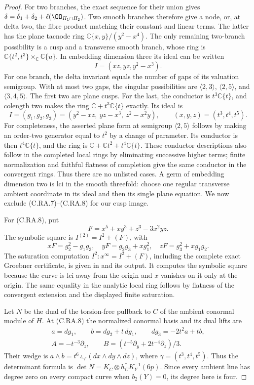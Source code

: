 \begin{proof}
For two branches, the exact sequence for their union gives
$\delta=\delta_1+\delta_2+\ell(\OO_{H_1\cap H_2})$.
Two smooth branches therefore give a node, or, at delta
two, the fibre product matching their constant and linear
terms. The latter has the plane tacnode ring
$\mathbb C\{x,y\}/(y^2-x^4)$.
The only remaining two-branch possibility is a cusp and
a transverse smooth branch, whose ring is
$\mathbb C\{t^2,t^3\}\times_{\mathbb C}\mathbb C\{u\}$.
In embedding dimension three its ideal can be written
\[
                  I=(xz,yz,y^2-x^3).            \tag{C.RA.7}
\]
For one branch, the delta invariant equals the number of
gaps of its valuation semigroup. With at most two gaps,
the singular possibilities are
$\langle2,3\rangle$, $\langle2,5\rangle$, and
$\langle3,4,5\rangle$. The first two are plane cusps.
For the last, the conductor is $t^3\mathbb C\{t\}$,
and colength two makes the ring
$\mathbb C+t^3\mathbb C\{t\}$ exactly. Its ideal is
\[
 I=(g_1,g_2,g_3)
   =(y^2-xz,\ yz-x^3,\ z^2-x^2y),\qquad
 (x,y,z)=(t^3,t^4,t^5).                         \tag{C.RA.8}
\]
For completeness, the asserted plane form at semigroup
$\langle2,5\rangle$ follows by making an order-two
generator equal to $t^2$ by a change of parameter.
Its conductor is then $t^4\mathbb C\{t\}$, and the ring
is $\mathbb C+\mathbb Ct^2+t^4\mathbb C\{t\}$.
These conductor descriptions also follow in the completed
local rings by eliminating successive higher terms; finite
normalization and faithful flatness of completion give the
same conductor in the convergent rings. Thus there are no
unlisted cases. A germ of embedding dimension two is lci
in the smooth threefold: choose one regular transverse
ambient coordinate in its ideal and then its single plane
equation. We now exclude (C.RA.7)--(C.RA.8) for our cusp
image.

For (C.RA.8), put
\[
 F=x^5+xy^3+z^3-3x^2yz .
\]
The symbolic square is $I^{(2)}=I^2+(F)$, with
\[
 xF=g_2^2-g_1g_3,\quad
 yF=g_2g_3+xg_1^2,\quad
 zF=g_3^2+xg_1g_2.                              \tag{C.RA.9}
\]
The saturation computation $I^2:x^\infty=I^2+(F)$,
including the complete exact Groebner certificate, is
given in  and its output.
It computes the symbolic square because the curve is lci
away from the origin and $x$ vanishes on it only at the
origin. The same equality in the analytic local ring
follows by flatness of the convergent extension and the
displayed finite saturation.

Let $N$ be the dual of the torsion-free pullback to $C$ of
the ambient conormal module of $H$. At (C.RA.8) the
normalized conormal basis and its dual lifts are
\[
\begin{gathered}
 a=dg_1,\qquad b=dg_2+t\,dg_1,\qquad
 dg_3=-2t^2a+tb,\\
 A=-t^{-3}\partial_z,\qquad
 B=(t^{-5}\partial_y+2t^{-4}\partial_z)/3 .
\end{gathered}                                  \tag{C.RA.10}
\]
Their wedge is $a\wedge b=t^6\,\iota_{\gamma'}(dx\wedge
dy\wedge dz)$, where $\gamma=(t^3,t^4,t^5)$.
Thus the determinant formula is
$\det N=K_C\otimes h_C^*K_Y^{-1}(6p)$.
Since every ambient line has degree zero on every compact
curve when $b_2(Y)=0$, its degree here is four.


\end{proof}
